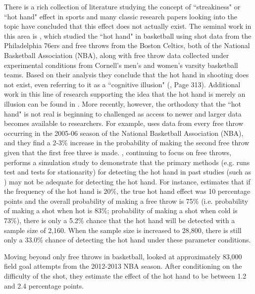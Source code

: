 \documentclass[letterpaper,12pt]{article}\usepackage[]{graphicx}\usepackage[]{color}
\begin{document}
There is a rich collection of literature studying the concept of ``streakiness" or ``hot hand" effect in sports and many classic research papers looking into the topic have concluded that this effect does not actually exist.  The seminal work in this area is \cite{Gilovich1985}, which studied the ``hot hand" in basketball using shot data from the Philadelphia 76ers and free throws from the Boston Celtics, both of the National Basketball Association (NBA), along with free throw data collected under experimental conditions from Cornell's men's and women's varsity basketball teams.  Based on their analysis they conclude that the hot hand in shooting does not exist, even referring to it as a ``cognitive illusion" (\cite{Gilovich1985}, Page 313).  Additional work in this line of research supporting the idea that the hot hand is merely an illusion can be found in \cite{HuizingaWeil2009,TverskyGilovich1989,KoehlerConley2003}.  More recently, however, the orthodoxy that the ``hot hand" is not real is beginning to challenged as access to newer and larger data becomes available to researchers.  For example, \cite{Arkes2010} uses data from every free throw occurring in the 2005-06 season of the National Basketball Association (NBA),  and they find a 2-3\% increase in the probability of making the second free throw given that the first free three is made. \cite{Arkes2013}, continuing to focus on free throws, performs a simulation study to demonstrate that the primary methods (e.g. runs test and tests for stationarity) for detecting the hot hand in past studies (such as \cite{HuizingaWeil2009,Gilovich1985,TverskyGilovich1989,KoehlerConley2003}) may not be adequate for detecting the hot hand.  For instance, \cite{Arkes2013} estimates that if the frequency of the hot hand is 20\%, the true hot hand effect was 10 percentage points and the overall probability of making a free throw is 75\% (i.e. probability of making a shot when hot is 83\%; probability of making a shot when cold is 73\%), there is only a 5.2\% chance that the hot hand will be detected with a sample size of 2,160.  When the sample size is increased to 28,800, there is still only a 33.0\% chance of detecting the hot hand under these parameter conditions.  

Moving beyond only free throws in basketball, \cite{BocskocskyEtAl2014} looked at approximately 83,000 field goal attempts from the 2012-2013 NBA season.  After conditioning on the difficulty of the shot, they estimate the effect of the hot hand to be between 1.2 and 2.4 percentage points.  
\end{document}
